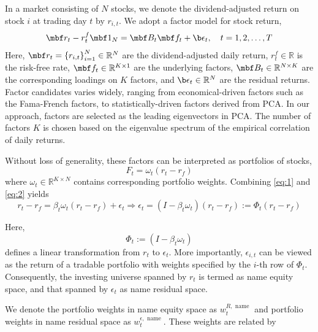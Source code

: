 \documentclass[12pt,article]{memoir}
\begin{document}
In a market consisting of $N$ stocks, we denote the dividend-adjusted return on stock $i$ at trading day $t$ by $r_{i, t}$. We adopt a factor model for stock return,
\begin{align}\label{eq:1}
\mbf r_t- r_t^f \mbf 1_N = \mbf B_t \mbf f_t+ \b \epsilon_t, \quad t=1,2, \ldots, T 
\end{align}
Here, $\mbf r_t=\left\{r_{i, t}\right\}_{i=1}^N \in \mathbb{R}^N$ are the dividend-adjusted daily return, $r_t^f \in \mathbb{R}$ is the risk-free rate, $\mbf f_t \in \mathbb{R}^{K \times 1}$ are the underlying factors, $\mbf B_t \in \mathbb{R}^{N \times K}$ are the corresponding loadings on $K$ factors, and $\b \epsilon_t \in \mathbb{R}^N$ are the residual returns. Factor candidates varies widely, ranging from economical-driven factors such as the Fama-French factors, to statistically-driven factors derived from PCA. In our approach, factors are selected as the leading eigenvectors in PCA. The number of factors $K$ is chosen based on the eigenvalue spectrum of the empirical correlation of daily returns.


Without loss of generality, these factors can be interpreted as portfolios of stocks,
\begin{equation}\label{eq:2}
	F_t=\omega_t\left(r_t-r_f\right)
\end{equation}
where $\omega_t \in \mathbb{R}^{K \times N}$ contains corresponding portfolio weights. Combining \cref{eq:1} and \cref{eq:2} yields
\begin{equation}\label{eq:3}
	r_t-r_f=\beta_t \omega_t\left(r_t-r_f\right)+\epsilon_t \Rightarrow \epsilon_t=\left(I-\beta_t \omega_t\right)\left(r_t-r_f\right):=\Phi_t\left(r_t-r_f\right)
\end{equation}

Here,
\begin{equation}\label{eq:4}
	\Phi_t:=\left(I-\beta_t \omega_t\right)
\end{equation}
defines a linear transformation from $r_t$ to $\epsilon_t$. More importantly, $\epsilon_{i, t}$ can be viewed as the return of a tradable portfolio with weights specified by the $i$-th row of $\Phi_t$. Consequently, the investing universe spanned by $r_t$ is termed as name equity space, and that spanned by $\epsilon_t$ as name residual space.

We denote the portfolio weights in name equity space as $w_t^{R, \text { name }}$ and portfolio weights in name residual space as $w_t^{\epsilon, \text { name }}$. These weights are related by
\end{document}
